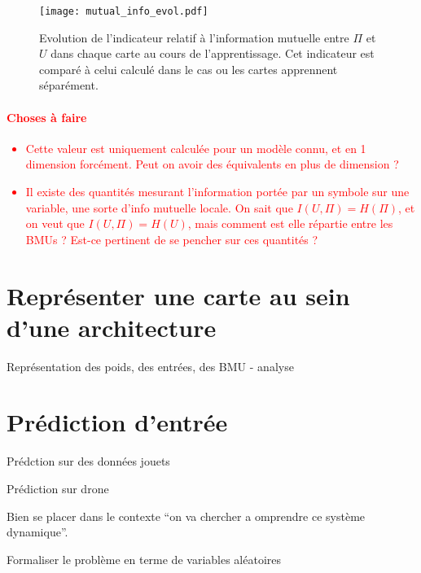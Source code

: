\begin{figure}
\centering
\texttt{[image: mutual\_info\_evol.pdf]}
\caption{Evolution de l'indicateur relatif à l'information mutuelle entre $\Pi$ et $U$ dans chaque carte au cours de l'apprentissage. Cet indicateur est comparé à celui calculé dans le cas ou les cartes apprennent séparément.}
\label{fig:im} 
\end{figure}

\textcolor{red}{
\paragraph{Choses à faire}
\begin{itemize}
\item Cette valeur est uniquement calculée pour un modèle connu, et en 1 dimension forcément. Peut on avoir des équivalents en plus de dimension ? 
\item Il existe des quantités mesurant l'information portée par un symbole sur une variable, une sorte d'info mutuelle locale. On sait que $I(U,\Pi) = H(\Pi)$, et on veut que $I(U,\Pi) = H(U)$, mais comment est elle répartie entre les BMUs ? Est-ce pertinent de se pencher sur ces quantités ? 
\end{itemize}
}


\section{Représenter une carte au sein d'une architecture}

Représentation des poids, des entrées, des BMU - analyse

\section{Prédiction d'entrée}

Prédction sur des données jouets

Prédiction sur drone



Bien se placer dans le contexte “on va chercher a omprendre ce système dynamique”.

Formaliser le problème en terme de variables aléatoires